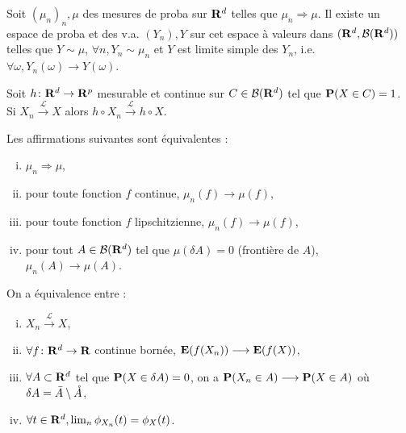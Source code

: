 	\begin{thm}
		Soit $(\mu_n)_n, \mu$ des mesures de proba sur $\mathbf{R}^d$ telles que $\mu_n \Rightarrow \mu$.
		Il existe un espace de proba et des v.a. $(Y_n), Y$ sur cet espace à valeurs dans $(\mathbf{R}^d,\mathcal{B}(\mathbf{R}^d))$ telles que $Y \sim \mu$, $\forall n, Y_n \sim \mu_n$ et $Y$ est limite simple des $Y_n$, i.e. $\forall \omega, Y_n(\omega) \longrightarrow Y(\omega)$.
	\end{thm}

	\begin{thm}[de continuité]
		Soit $h \colon \mathbf{R}^d \to \mathbf{R}^p$ mesurable et continue sur $C \in \mathcal{B}(\mathbf{R}^d)$ tel que $\mathbf{P}(X \in C) = 1$.
		Si $X_n \overset{\mathcal{L}}{\longrightarrow} X$ alors $h \circ X_n \overset{\mathcal{L}}{\longrightarrow} h \circ X$.
	\end{thm}
	
	\begin{thm}
		Les affirmations suivantes sont équivalentes :
		\begin{enumerate}[(i)]
			\item $\mu_n \Rightarrow \mu$,
			\item pour toute fonction $f$ continue, $\mu_n(f) \longrightarrow \mu(f)$,
			\item pour toute fonction $f$ lipschitzienne, $\mu_n(f) \longrightarrow \mu(f)$,
			\item pour tout $A \in \mathcal{B}(\mathbf{R}^d)$ tel que $\mu(\delta A) = 0$ (frontière de $A$), $\mu_n(A) \longrightarrow \mu(A)$.
		\end{enumerate}
	\end{thm}
	
	\begin{thm}
		On a équivalence entre :
		\begin{enumerate}[(i)]
			\item $X_n \overset{\mathcal{L}}{\longrightarrow} X$,
			\item $\forall f \colon \mathbf{R}^d \to \mathbf{R}$ continue bornée, $\mathbf{E}(f(X_n)) \longrightarrow \mathbf{E}(f(X))$,
			\item $\forall A \subset \mathbf{R}^d$ tel que $\mathbf{P}(X \in \delta A) = 0$, on a $\mathbf{P}(X_n \in A) \longrightarrow \mathbf{P}(X \in A)$ où $\delta A = \Bar{A} \setminus \mathring{A}$,
			\item $\forall t \in \mathbf{R}^d, \lim_n \phi_{X_n}(t) = \phi_X(t)$.
		\end{enumerate}
	\end{thm}
	
